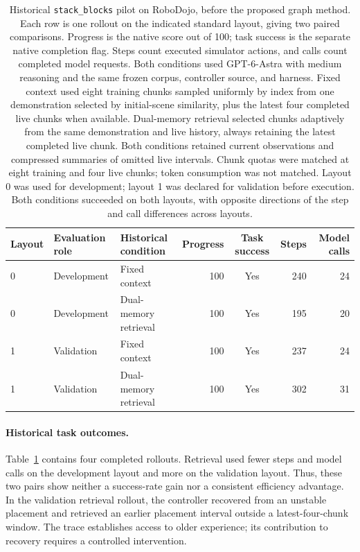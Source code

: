\documentclass[10pt,twocolumn,letterpaper]{article}
\begin{document}
\begin{table}[t]
\centering
\small
\begin{tabular}{lllrcrr}
\toprule
Layout & Evaluation role & Historical condition & Progress & Task success & Steps & Model calls \\
\midrule
0 & Development & Fixed context & 100 & Yes & 240 & 24 \\
0 & Development & Dual-memory retrieval & 100 & Yes & 195 & 20 \\
1 & Validation & Fixed context & 100 & Yes & 237 & 24 \\
1 & Validation & Dual-memory retrieval & 100 & Yes & 302 & 31 \\
\bottomrule
\end{tabular}
\caption{Historical \texttt{stack\_blocks} pilot on RoboDojo, before the proposed graph method. Each row is one rollout on the indicated standard layout, giving two paired comparisons. Progress is the native score out of 100; task success is the separate native completion flag. Steps count executed simulator actions, and calls count completed model requests. Both conditions used GPT-6-Astra with medium reasoning and the same frozen corpus, controller source, and harness. Fixed context used eight training chunks sampled uniformly by index from one demonstration selected by initial-scene similarity, plus the latest four completed live chunks when available. Dual-memory retrieval selected chunks adaptively from the same demonstration and live history, always retaining the latest completed live chunk. Both conditions retained current observations and compressed summaries of omitted live intervals. Chunk quotas were matched at eight training and four live chunks; token consumption was not matched. Layout 0 was used for development; layout 1 was declared for validation before execution. Both conditions succeeded on both layouts, with opposite directions of the step and call differences across layouts.}
\label{tab:historical-pilot}
\end{table}

\paragraph{Historical task outcomes.}
Table~\ref{tab:historical-pilot} contains four completed rollouts. Retrieval used fewer steps and model calls on the development layout and more on the validation layout. Thus, these two pairs show neither a success-rate gain nor a consistent efficiency advantage. In the validation retrieval rollout, the controller recovered from an unstable placement and retrieved an earlier placement interval outside a latest-four-chunk window. The trace establishes access to older experience; its contribution to recovery requires a controlled intervention.
\end{document}
